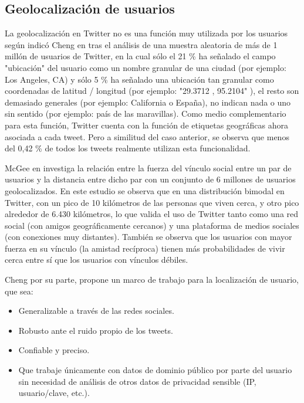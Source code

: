 \subsection{Geolocalización de usuarios}

La geolocalización en Twitter no es una función muy utilizada por los usuarios según indicó Cheng en \cite{Cheng:2010:YYT:1871437.1871535} tras el análisis de una muestra aleatoria de más de 1 millón de usuarios de Twitter, en la cual sólo el 21 \% ha señalado el campo "ubicación" del usuario como un nombre granular de una ciudad (por ejemplo: Los Angeles, CA) y sólo 5 \% ha señalado una ubicación tan granular como coordenadas de latitud / longitud (por ejemplo: "29.3712 , 95.2104" ), el resto son demasiado generales (por ejemplo: California o España), no indican nada o uno sin sentido (por ejemplo: país de las maravillas). Como medio complementario para esta función, Twitter cuenta con la función de etiquetas geográficas ahora asociada a cada tweet. Pero a similitud del caso anterior, se observa que menos del 0,42 \% de todos los tweets realmente utilizan esta funcionalidad.

McGee en \cite{McGee:2011:GST:2063576.2063959} investiga la relación entre la fuerza del vínculo social entre un par de usuarios y la distancia entre dicho par con un conjunto de 6 millones de usuarios geolocalizados. En este estudio se observa que en una distribución bimodal en Twitter, con un pico de 10 kilómetros de las personas que viven cerca, y otro pico alrededor de 6.430 kilómetros, lo que valida el uso de Twitter tanto como una red social (con amigos geográficamente cercanos) y una plataforma de medios sociales (con conexiones muy distantes). También se observa que los usuarios con mayor fuerza en su vínculo (la amistad recíproca) tienen más probabilidades de vivir cerca entre sí que los usuarios con vínculos débiles.

Cheng por su parte, propone un marco de trabajo para la localización de usuario, que sea:
\begin{itemize}
 \item Generalizable a través de las redes sociales.
 \item Robusto ante el ruido propio de los tweets.
 \item Confiable y preciso.
 \item Que trabaje únicamente con datos de dominio público por parte del usuario sin necesidad de análisis de otros datos de privacidad sensible (IP, usuario/clave, etc.).
\end{itemize}

